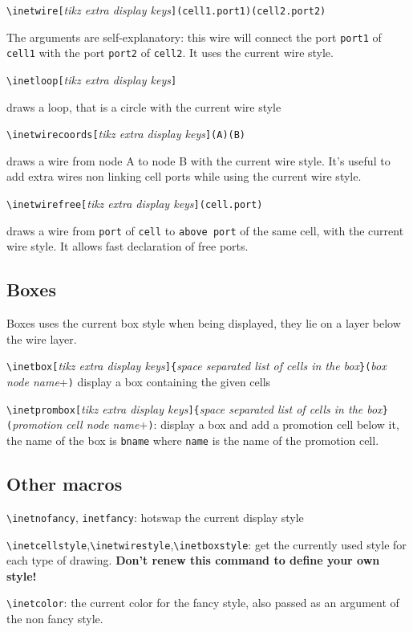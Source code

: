 \documentclass[10pt,a4paper]{article}
\begin{document}
\verb+\inetwire[+\emph{tikz extra display keys}\verb+](cell1.port1)(cell2.port2)+

The arguments are self-explanatory: this wire will connect the port \verb+port1+
of \verb+cell1+ with the port \verb+port2+ of \verb+cell2+. It uses the current
wire style.

\verb+\inetloop[+\emph{tikz extra display keys}\verb+]+ 

draws a loop, that is a circle with the current wire style

\verb+\inetwirecoords[+\emph{tikz extra display keys}\verb+](A)(B)+ 

draws a wire from node A to node B with the current wire style. It's useful
to add extra wires non linking cell ports while using the current wire style.

\verb+\inetwirefree[+\emph{tikz extra display keys}\verb+](cell.port)+

draws a wire from \verb+port+ of \verb+cell+ to \verb+above port+
of the same cell, with
the current wire style. It allows fast declaration of free ports.

\subsection{Boxes}
Boxes uses the current box style when being displayed, they lie on a 
layer below the wire layer.

\verb+\inetbox[+\emph{tikz extra display keys}\verb+]{+\emph{space 
separated list of cells in the box}\verb+}(+\emph{box node name}+\verb+)+
display a box containing the given cells

\verb+\inetprombox[+\emph{tikz extra display keys}\verb+]{+\emph{space 
separated list of cells in the box}\verb+}(+\emph{promotion cell 
node name}+\verb+)+: display a box and add a promotion cell below it, 
the name of the box is \verb+bname+ where \verb+name+ is the name
of the promotion cell.



\subsection{Other macros}
\verb+\inetnofancy+, \verb+inetfancy+: hotswap the current display style

\verb+\inetcellstyle+,\verb+\inetwirestyle+,\verb+\inetboxstyle+: get
the currently used style for each type of drawing. \textbf{Don't renew this
command to define your own style!}

\verb+\inetcolor+: the current color for the fancy style, also passed
as an argument of the non fancy style.
\end{document}
